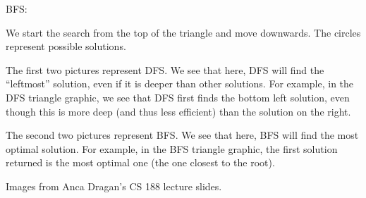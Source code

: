 \begin{blocksection}
\begin{solution}[0.25in]
BFS:

We start the search from the top of the triangle and move downwards. The
circles represent possible solutions.

The first two pictures represent DFS. We see that here, DFS will find the
``leftmost'' solution, even if it is deeper than other solutions. For example,
in the DFS triangle graphic, we see that DFS first finds the bottom left
solution, even though this is more deep (and thus less efficient) than the
solution on the right.

The second two pictures represent BFS.  We see that here, BFS will find the
most optimal solution.  For example, in the BFS triangle graphic, the first
solution returned is the most optimal one (the one closest to the root).

Images from Anca Dragan's CS 188 lecture slides.
\end{solution}
\end{blocksection}
